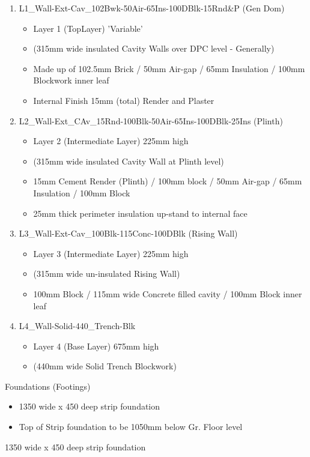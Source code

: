 \begin{enumerate}
	\item L1\_Wall-Ext-Cav\_102Bwk-50Air-65Ins-100DBlk-15Rnd\&P (Gen Dom)
	\begin{itemize}
		\item Layer 1 (TopLayer) 'Variable'
		\item (315mm wide insulated Cavity Walls over DPC level - Generally)
		\item Made up of 102.5mm Brick / 50mm Air-gap / 65mm Insulation / 100mm Blockwork inner leaf
		\item Internal Finish 15mm (total) Render and Plaster
	\end{itemize}
	
	\item L2\_Wall-Ext\_CAv\_15Rnd-100Blk-50Air-65Ins-100DBlk-25Ins (Plinth)
	\begin{itemize}
		\item Layer 2 (Intermediate Layer) 225mm high
		\item (315mm wide insulated Cavity Wall at Plinth level)
		\item 15mm Cement Render (Plinth) / 100mm block / 50mm Air-gap / 65mm Insulation / 100mm Block
		\item 25mm thick perimeter insulation up-stand to internal face
	\end{itemize}
	
	
	\item L3\_Wall-Ext-Cav\_100Blk-115Conc-100DBlk (Rising Wall)
	\begin{itemize}
		\item Layer 3 (Intermediate Layer) 225mm high
		\item (315mm wide un-insulated Rising Wall)
		\item 100mm Block / 115mm wide Concrete filled cavity / 100mm Block inner leaf
	\end{itemize}
	
	
	\item L4\_Wall-Solid-440\_Trench-Blk
	\begin{itemize}
		\item Layer 4 (Base Layer) 675mm high
		\item (440mm wide Solid Trench Blockwork)
	\end{itemize}
\end{enumerate}

Foundations (Footings)

\begin{itemize}
	\item 1350 wide x 450 deep strip foundation
	\item Top of Strip foundation to be 1050mm below Gr. Floor level
\end{itemize}
1350 wide x 450 deep strip foundation


